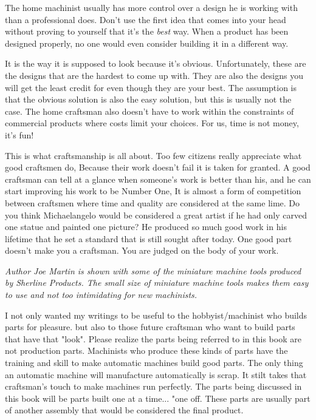 
The home machinist usually has more control over a design he is working with
than a professional does. Don't use the first idea that comes into your head
without proving to yourself that it's the \emph{best} way. When a product has
been designed properly, no one would even consider building it in a different
way.

It is the way it is supposed to look because it's obvious. Unfortunately, these
are the designs that are the hardest to come up with. They are also the designs
you will get the least credit for even though they are your best. The assumption
is that the obvious solution is also the easy solution, but this is usually not
the case. The home craftsman also doesn't have to work within the constraints of
commercial products where costs limit your choices. For us, time is not money,
it's fun!

This is what craftsmanship is all about. Too few citizens really appreciate what
good craftsmen do, Because their work doesn't fail it is taken for granted. A
good craftsman can tell at a glance when someone's work is better than his, and
he can start improving his work to be Number One, It is almost a form of
competition between craftsmen where time and quality are considered at the same
lime. Do you think Michaelangelo would be considered a great artist if he had
only carved one statue and painted one picture? He produced so much good work in
his lifetime that he set a standard that is still sought after today. One good
part doesn't make you a craftsman. You are judged on the body of your work.

\bigskip\textit{Author Joe Martin is shown with some of the miniature machine
tools produced by Sherline Products. The small size of miniature machine tools
makes them easy to use and not too intimidating for new machinists.}\bigskip

I not only wanted my writings to be useful to the hobbyist/machinist who builds
parts for pleasure. but also to those future craftsman who want to build parts
that have that "look". Please realize the parts being referred to in this book
are not production parts. Machinists who produce these kinds of parts have the
training and skill to make automatic machines build good parts. The only thing
an automatic machine will manufacture automatically is scrap. It stilt takes
that craftsman's touch to make machines run perfectly. The parts being discussed
in this book will be parts built one at a time... "one off. These parts are
usually part of another assembly that would be considered the final product.

